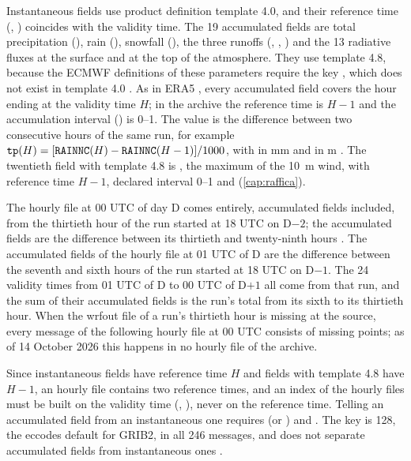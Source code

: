 Instantaneous fields use product definition template 4.0, and their reference time
(, ) coincides with the validity time. The 19 accumulated fields
are total precipitation (), rain (), snowfall (), the
three runoffs (, , ) and the 13 radiative fluxes at the surface
and at the top of the atmosphere. They use template 4.8, because the ECMWF definitions of these
parameters require the key , which does not exist in template
4.0 \parencite{eccodes}. As in ERA5 \parencite{era5doc}, every accumulated field covers the hour
ending at the validity time $H$; in the archive the reference time is $H-1$ and the accumulation
interval () is 0--1. The value is the difference between two consecutive hours of the same
run, for example $\campo{tp}(H) = [\campo{RAINNC}(H) - \campo{RAINNC}(H-1)]/1000$, with
 in \si{mm} and  in \si{m} \parencite{issue70}. The twentieth field with
template 4.8 is , the maximum of the \SI{10}{m} wind, with reference time $H-1$,
declared interval 0--1 and  (\cref{cap:raffica}).

The hourly file at 00 UTC of day D comes entirely, accumulated fields included, from the thirtieth
hour of the run started at 18 UTC on D$-2$; the accumulated fields are the difference between its
thirtieth and twenty-ninth hours \parencite{issue71,issue72}. The accumulated fields of the hourly
file at 01 UTC of D are the difference between the seventh and sixth hours of the run started at
18 UTC on D$-1$. The 24 validity times from 01 UTC of D to 00 UTC of D$+1$ all come from that run,
and the sum of their accumulated fields is the run's total from its sixth to its thirtieth hour.
When the wrfout file of a run's thirtieth hour is missing at the source, every message of the
following hourly file at 00 UTC consists of missing points; as of 14 October 2026 this happens in no
hourly file of the archive.

Since instantaneous fields have reference time $H$ and fields with template 4.8 have $H-1$, an
hourly file contains two reference times, and an index of the hourly files must be built on the
validity time (, ), never on the reference time.
Telling an accumulated field from an instantaneous one requires  (or
) and . The key
 is 128, the eccodes default for GRIB2, in all 246 messages,
and does not separate accumulated fields from instantaneous ones \parencite{issue53}.


